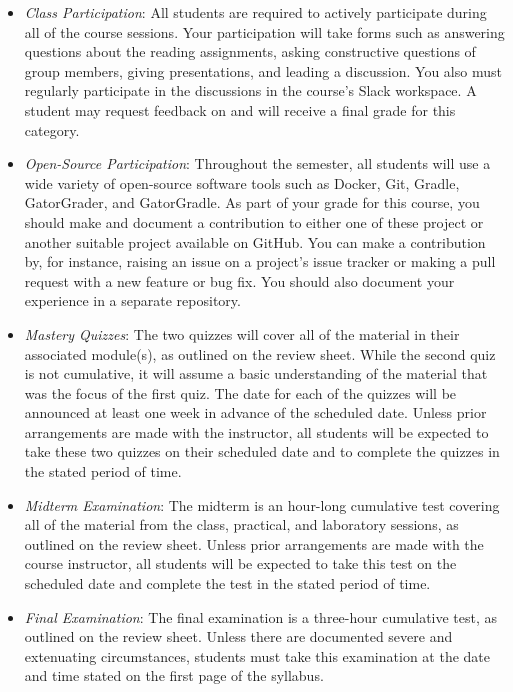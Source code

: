 \documentclass[11pt]{article}
\begin{document}
\begin{itemize}

  \item {\em Class Participation\/}: All students are required to actively
    participate during all of the course sessions. Your participation will take
    forms such as answering questions about the reading assignments, asking
    constructive questions of group members, giving presentations, and leading a
    discussion. You also must regularly participate in the discussions in the
    course's Slack workspace. A student may request feedback on and will receive a
    final grade for this category.

  \item {\em Open-Source Participation\/}: Throughout the semester, all students
    will use a wide variety of open-source software tools such as Docker, Git,
    Gradle, GatorGrader, and GatorGradle. As part of your grade for this course,
    you should make and document a contribution to either one of these project
    or another suitable project available on GitHub. You can make a contribution
    by, for instance, raising an issue on a project's issue tracker or making a
    pull request with a new feature or bug fix. You should also document your
    experience in a separate repository.

  \item {\em Mastery Quizzes\/}: The two quizzes will cover all of the material
    in their associated module(s), as outlined on the review sheet. While the
    second quiz is not cumulative, it will assume a basic understanding of the
    material that was the focus of the first quiz. The date for each of the
    quizzes will be announced at least one week in advance of the scheduled
    date. Unless prior arrangements are made with the instructor, all students
    will be expected to take these two quizzes on their scheduled date and to
    complete the quizzes in the stated period of time.

  \item {\em Midterm Examination\/}: The midterm is an hour-long cumulative test
    covering all of the material from the class, practical, and laboratory
    sessions, as outlined on the review sheet. Unless prior arrangements are
    made with the course instructor, all students will be expected to take this
    test on the scheduled date and complete the test in the stated period of
    time.

  \item {\em Final Examination\/}: The final examination is a three-hour
    cumulative test, as outlined on the review sheet. Unless there are
    documented severe and extenuating circumstances, students must take this
    examination at the date and time stated on the first page of the syllabus.


\end{itemize}
\end{document}
